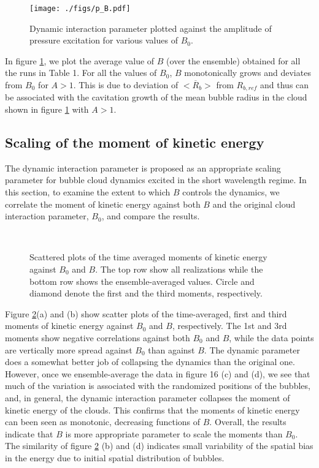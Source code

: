 \documentclass{jfm}
\begin{document}
\begin{figure}
  \center
  \texttt{[image: ./figs/p\_B.pdf]}
  \caption{Dynamic interaction parameter plotted against the amplitude of pressure excitation for various values of $B_0$.}
   \label{fig:P_B} 
\end{figure}
In figure \ref{fig:P_B}, we plot the average value of $B$ (over the ensemble) obtained for all the runs in Table 1.  
For all the values of $B_0$, $B$ monotonically grows and deviates from $B_0$ for $A>1$.
This is due to deviation of $<\overline{R}_b>$ from $R_{b,ref}$ and thus can be associated with the cavitation growth of the mean bubble radius in the cloud shown in figure \ref{fig:P_B} with $A>1$.

\subsection{Scaling of the moment of kinetic energy}
\label{section:moment}
The dynamic interaction parameter is proposed as an appropriate scaling parameter for bubble cloud dynamics excited in the short wavelength regime.
In this section, to examine the extent to which $B$ controls the dynamics, we correlate the moment of kinetic energy against both $B$ and the original cloud interaction parameter, $B_0$, and compare the results.

\begin{figure}
  \center
  \\
  \caption{Scattered plots of the time averaged moments of kinetic energy against $B_0$ and $B$. The top row show all realizations while the bottom row shows the ensemble-averaged values. Circle and diamond denote the first and the third moments, respectively.
   }
   \label{fig:B_xkc}
\end{figure}
Figure \ref{fig:B_xkc}(a) and (b) show scatter plots of the time-averaged, first and third moments of kinetic energy against $B_0$ and $B$, respectively.
The 1st and 3rd moments show negative correlations against both $B_0$ and $B$, while the data points are vertically more spread against $B_0$ than against $B$.
The dynamic parameter does a somewhat better job of collapsing the dynamics than the original one.
However, once we ensemble-average the data in figure 16 (c) and (d), we see that much of the variation is associated with the randomized positions of the bubbles, and, in general, the dynamic interaction parameter collapses the moment of kinetic energy of the clouds.
This confirms that the moments of kinetic energy can been seen as monotonic, decreasing functions of $B$.
Overall, the results indicate that $B$ is more appropriate parameter to scale the moments than $B_0$.
The similarity of figure \ref{fig:B_xkc} (b) and (d) indicates small variability of the spatial bias in the energy due to initial spatial distribution of bubbles.
\end{document}
